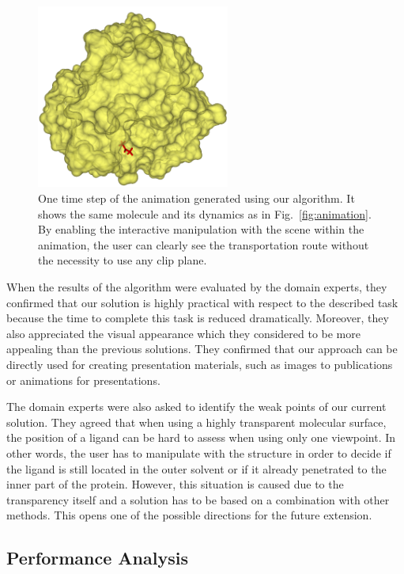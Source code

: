 \begin{figure}[htb]
  \centering
  \includegraphics[width=2.5in]{image/ligand.png}
  \caption{One time step of the animation generated using our algorithm. It shows the same molecule and its dynamics as in Fig.~\ref{fig:animation}. By enabling the interactive manipulation with the scene within the animation, the user can clearly see the transportation route without the necessity to use any clip plane.}
	\label{fig:animation2}
\end{figure}

When the results of the algorithm were evaluated by the domain experts, they confirmed that our solution is highly practical with respect to the described task because the time to complete this task is reduced dramatically.
Moreover, they also appreciated the visual appearance which they considered to be more appealing than the previous solutions.
They confirmed that our approach can be directly used for creating presentation materials, such as images to publications or animations for presentations.

The domain experts were also asked to identify the weak points of our current solution.
They agreed that when using a highly transparent molecular surface, the position of a ligand can be hard to assess when using only one viewpoint.
In other words, the user has to manipulate with the structure in order to decide if the ligand is still located in the outer solvent or if it already penetrated to the inner part of the protein.
However, this situation is caused due to the transparency itself and a solution has to be based on a combination with other methods.
This opens one of the possible directions for the future extension.

\subsection{Performance Analysis}
\label{sec:performance}

